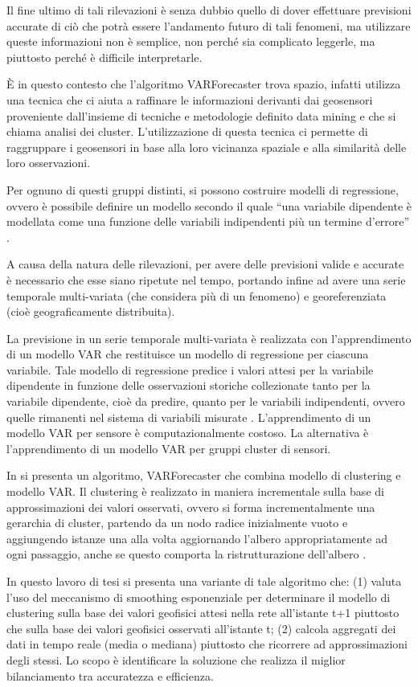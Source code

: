 \documentclass[12pt,a4paper,oneside,openright]{book}
\begin{document}
Il fine ultimo di tali rilevazioni è senza dubbio quello di dover effettuare previsioni accurate di ciò che potrà essere l’andamento futuro di tali fenomeni, ma utilizzare queste informazioni non è semplice, non perché sia complicato leggerle, ma piuttosto perché è difficile interpretarle. 


È in questo contesto che l’algoritmo VARForecaster trova spazio, infatti utilizza una tecnica che ci aiuta a raffinare le informazioni derivanti dai geosensori proveniente dall’insieme di tecniche e metodologie definito data mining e che si chiama analisi dei cluster. L’utilizzazione di questa tecnica ci permette di raggruppare i geosensori in base alla loro vicinanza spaziale e alla similarità delle loro osservazioni.

Per ognuno di questi gruppi distinti, si possono costruire modelli di regressione, ovvero è possibile definire un modello secondo il quale “una variabile dipendente è modellata come una funzione delle variabili indipendenti più un termine d'errore” \cite{2a}.

A causa della natura delle rilevazioni, per avere delle previsioni valide e accurate è necessario che esse siano ripetute nel tempo, portando infine ad avere una serie temporale multi-variata (che considera più di un fenomeno) e georeferenziata (cioè geograficamente distribuita).


La previsione in un serie temporale multi-variata è realizzata con l'apprendimento di un modello VAR che restituisce un modello di regressione per ciascuna variabile. Tale modello di regressione predice i valori attesi per la variabile dipendente in funzione delle osservazioni storiche collezionate tanto per la variabile dipendente, cioè da predire, quanto per le variabili indipendenti, ovvero quelle rimanenti nel sistema di variabili misurate \cite{3a}. L'apprendimento di un modello VAR per sensore è computazionalmente costoso. La alternativa è l'apprendimento di un modello VAR per gruppi cluster di sensori.


In \cite{donato} si presenta un algoritmo, VARForecaster che combina modello di clustering e modello VAR. Il clustering è realizzato in maniera incrementale sulla base di approssimazioni dei valori osservati, ovvero si forma incrementalmente una gerarchia di cluster, partendo da un nodo radice inizialmente vuoto e aggiungendo istanze una alla volta aggiornando l’albero appropriatamente ad ogni passaggio, anche se questo comporta la ristrutturazione dell’albero \cite{4a}.

In questo lavoro di tesi si presenta una variante di tale algoritmo che: (1) valuta l'uso del meccanismo di smoothing esponenziale per determinare il modello di clustering sulla base dei valori geofisici attesi nella rete all'istante t+1 piuttosto che sulla base dei valori geofisici osservati all'istante t; (2) calcola aggregati dei dati in tempo reale (media o mediana) piuttosto che ricorrere ad approssimazioni degli stessi. Lo scopo è identificare la soluzione che realizza il miglior bilanciamento tra accuratezza e efficienza.
\newpage
\end{document}
